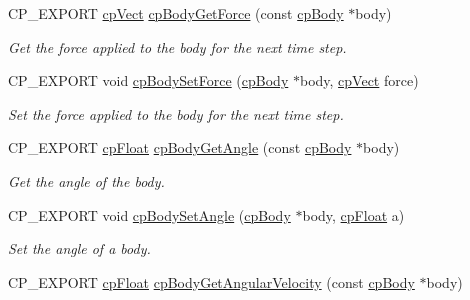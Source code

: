 \begin{DoxyCompactItemize}
C\+P\+\_\+\+E\+X\+P\+O\+RT \mbox{\hyperlink{structcp_vect}{cp\+Vect}} \mbox{\hyperlink{group__cp_body_ga8be8f23f2dd41bf20a23b41e87232f46}{cp\+Body\+Get\+Force}} (const \mbox{\hyperlink{structcp_body}{cp\+Body}} $\ast$body)
\begin{DoxyCompactList}\small\item\em Get the force applied to the body for the next time step. \end{DoxyCompactList}\item 
\mbox{\label{group__cp_body_ga475392f72dee32071e0248c492afc342}} 
C\+P\+\_\+\+E\+X\+P\+O\+RT void \mbox{\hyperlink{group__cp_body_ga475392f72dee32071e0248c492afc342}{cp\+Body\+Set\+Force}} (\mbox{\hyperlink{structcp_body}{cp\+Body}} $\ast$body, \mbox{\hyperlink{structcp_vect}{cp\+Vect}} force)
\begin{DoxyCompactList}\small\item\em Set the force applied to the body for the next time step. \end{DoxyCompactList}\item 
\mbox{\label{group__cp_body_gae61b861f4de0179abbec6bbe32b88c0c}} 
C\+P\+\_\+\+E\+X\+P\+O\+RT \mbox{\hyperlink{group__basic_types_gac1ed65573e035bf892505768c852d8d3}{cp\+Float}} \mbox{\hyperlink{group__cp_body_gae61b861f4de0179abbec6bbe32b88c0c}{cp\+Body\+Get\+Angle}} (const \mbox{\hyperlink{structcp_body}{cp\+Body}} $\ast$body)
\begin{DoxyCompactList}\small\item\em Get the angle of the body. \end{DoxyCompactList}\item 
\mbox{\label{group__cp_body_gacdb6ef07e0efedbde6f7742fb805e0e2}} 
C\+P\+\_\+\+E\+X\+P\+O\+RT void \mbox{\hyperlink{group__cp_body_gacdb6ef07e0efedbde6f7742fb805e0e2}{cp\+Body\+Set\+Angle}} (\mbox{\hyperlink{structcp_body}{cp\+Body}} $\ast$body, \mbox{\hyperlink{group__basic_types_gac1ed65573e035bf892505768c852d8d3}{cp\+Float}} a)
\begin{DoxyCompactList}\small\item\em Set the angle of a body. \end{DoxyCompactList}\item 
\mbox{\label{group__cp_body_ga68852fe11b09c4dd14385f7f5e4454bf}} 
C\+P\+\_\+\+E\+X\+P\+O\+RT \mbox{\hyperlink{group__basic_types_gac1ed65573e035bf892505768c852d8d3}{cp\+Float}} \mbox{\hyperlink{group__cp_body_ga68852fe11b09c4dd14385f7f5e4454bf}{cp\+Body\+Get\+Angular\+Velocity}} (const \mbox{\hyperlink{structcp_body}{cp\+Body}} $\ast$body)

\end{DoxyCompactItemize}

